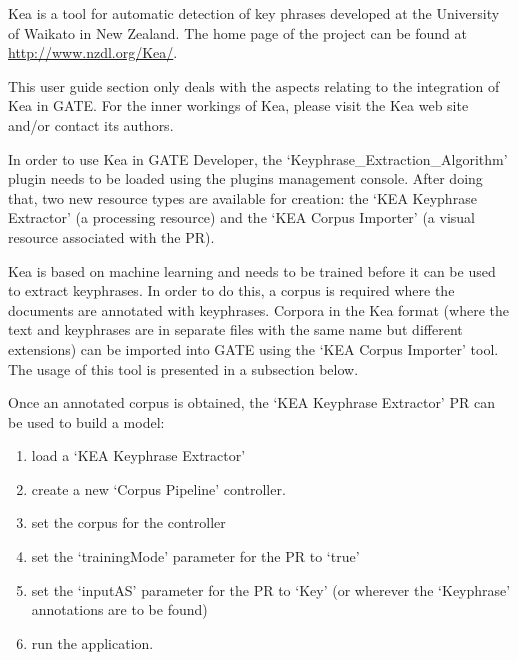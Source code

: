

Kea is a tool for automatic detection of key phrases developed at
the University of Waikato in New Zealand. The home page of the project can be
found at \url{http://www.nzdl.org/Kea/}.

This user guide section only deals with the aspects relating to the integration
of Kea in GATE. For the inner workings of Kea, please visit the Kea web site
and/or contact its authors.

In order to use Kea in GATE Developer, the `Keyphrase\_Extraction\_Algorithm'
plugin needs to be loaded using the plugins management console. After doing that,
two new resource types are available for creation: the `KEA Keyphrase
Extractor' (a processing resource) and the `KEA Corpus Importer' (a visual
resource associated with the PR).


Kea is based on machine learning and needs to be trained before it can be used
to extract keyphrases. In order to do this, a corpus is required where the
documents are annotated with keyphrases. Corpora in the Kea format (where the
text and keyphrases are in separate files with the same name but different
extensions) can be imported into GATE using the `KEA Corpus Importer' tool.  The
usage of this tool is presented in a subsection below.

Once an annotated corpus is obtained, the `KEA Keyphrase Extractor' PR can be
used to build a model:
\begin{enumerate}
\item load a `KEA Keyphrase Extractor'
\item create a new `Corpus Pipeline' controller.
\item set the corpus for the controller
\item set the `trainingMode' parameter for the PR to `true'
\item set the `inputAS' parameter for the PR to `Key' (or wherever the
  `Keyphrase' annotations are to be found)
\item run the application.
\end{enumerate}

